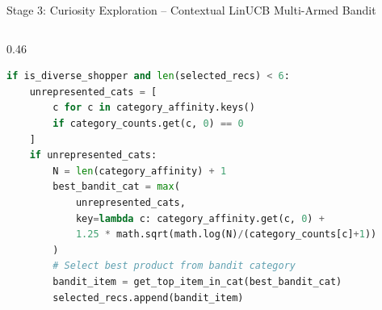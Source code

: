 \documentclass[10pt]{beamer}
\begin{document}
\begin{frame}[fragile]{Stage 3: Curiosity Exploration -- Contextual LinUCB Multi-Armed Bandit}
\begin{columns}[T]
\begin{column}{0.46\textwidth}
\begin{lstlisting}[language=Python]
if is_diverse_shopper and len(selected_recs) < 6:
    unrepresented_cats = [
        c for c in category_affinity.keys() 
        if category_counts.get(c, 0) == 0
    ]
    if unrepresented_cats:
        N = len(category_affinity) + 1
        best_bandit_cat = max(
            unrepresented_cats,
            key=lambda c: category_affinity.get(c, 0) + 
            1.25 * math.sqrt(math.log(N)/(category_counts[c]+1))
        )
        # Select best product from bandit category
        bandit_item = get_top_item_in_cat(best_bandit_cat)
        selected_recs.append(bandit_item)
\end{lstlisting}
    \end{column}
\end{columns}
\end{frame}

\end{document}
